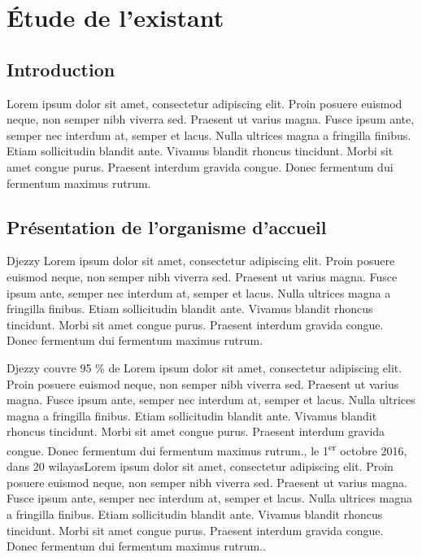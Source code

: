 \chapter{Étude de l'existant}
\clearpage
\label{sec:organisme}

\section{Introduction}
Lorem ipsum dolor sit amet, consectetur adipiscing elit. Proin posuere euismod neque, non semper nibh viverra sed. Praesent ut varius magna. Fusce ipsum ante, semper nec interdum at, semper et lacus. Nulla ultrices magna a fringilla finibus. Etiam sollicitudin blandit ante. Vivamus blandit rhoncus tincidunt. Morbi sit amet congue purus. Praesent interdum gravida congue. Donec fermentum dui fermentum maximus rutrum.


\section{Présentation de l'organisme d'accueil}
Djezzy Lorem ipsum dolor sit amet, consectetur adipiscing elit. Proin posuere euismod neque, non semper nibh viverra sed. Praesent ut varius magna. Fusce ipsum ante, semper nec interdum at, semper et lacus. Nulla ultrices magna a fringilla finibus. Etiam sollicitudin blandit ante. Vivamus blandit rhoncus tincidunt. Morbi sit amet congue purus. Praesent interdum gravida congue. Donec fermentum dui fermentum maximus rutrum.

\medskip

Djezzy couvre 95 \% de Lorem ipsum dolor sit amet, consectetur adipiscing elit. Proin posuere euismod neque, non semper nibh viverra sed. Praesent ut varius magna. Fusce ipsum ante, semper nec interdum at, semper et lacus. Nulla ultrices magna a fringilla finibus. Etiam sollicitudin blandit ante. Vivamus blandit rhoncus tincidunt. Morbi sit amet congue purus. Praesent interdum gravida congue. Donec fermentum dui fermentum maximus rutrum., le 1\textsuperscript{er} octobre 2016, dans 20 wilayasLorem ipsum dolor sit amet, consectetur adipiscing elit. Proin posuere euismod neque, non semper nibh viverra sed. Praesent ut varius magna. Fusce ipsum ante, semper nec interdum at, semper et lacus. Nulla ultrices magna a fringilla finibus. Etiam sollicitudin blandit ante. Vivamus blandit rhoncus tincidunt. Morbi sit amet congue purus. Praesent interdum gravida congue. Donec fermentum dui fermentum maximus rutrum..

\medskip

